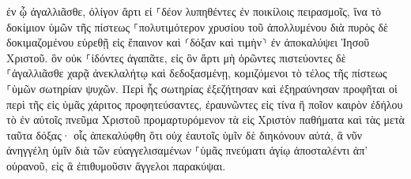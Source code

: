 \documentclass{openreader}
\begin{document}
ἐν ᾧ ἀγαλλιᾶσθε, ὀλίγον ἄρτι εἰ ⸀δέον λυπηθέντες ἐν ποικίλοις πειρασμοῖς, 
ἵνα τὸ δοκίμιον ὑμῶν τῆς πίστεως ⸀πολυτιμότερον χρυσίου τοῦ ἀπολλυμένου διὰ πυρὸς δὲ δοκιμαζομένου εὑρεθῇ εἰς ἔπαινον καὶ ⸂δόξαν καὶ τιμὴν⸃ ἐν ἀποκαλύψει Ἰησοῦ Χριστοῦ. 
ὃν οὐκ ⸀ἰδόντες ἀγαπᾶτε, εἰς ὃν ἄρτι μὴ ὁρῶντες πιστεύοντες δὲ ⸀ἀγαλλιᾶσθε χαρᾷ ἀνεκλαλήτῳ καὶ δεδοξασμένῃ, 
κομιζόμενοι τὸ τέλος τῆς πίστεως ⸀ὑμῶν σωτηρίαν ψυχῶν. 
Περὶ ἧς σωτηρίας ἐξεζήτησαν καὶ ἐξηραύνησαν προφῆται οἱ περὶ τῆς εἰς ὑμᾶς χάριτος προφητεύσαντες, 
ἐραυνῶντες εἰς τίνα ἢ ποῖον καιρὸν ἐδήλου τὸ ἐν αὐτοῖς πνεῦμα Χριστοῦ προμαρτυρόμενον τὰ εἰς Χριστὸν παθήματα καὶ τὰς μετὰ ταῦτα δόξας· 
οἷς ἀπεκαλύφθη ὅτι οὐχ ἑαυτοῖς ὑμῖν δὲ διηκόνουν αὐτά, ἃ νῦν ἀνηγγέλη ὑμῖν διὰ τῶν εὐαγγελισαμένων ⸀ὑμᾶς πνεύματι ἁγίῳ ἀποσταλέντι ἀπ’ οὐρανοῦ, εἰς ἃ ἐπιθυμοῦσιν ἄγγελοι παρακύψαι. 
\end{document}
